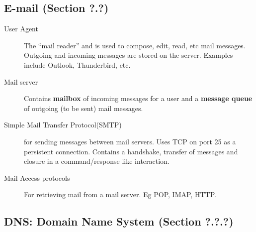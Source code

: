 \documentclass{article}
\begin{document}
\subsection*{E-mail (Section ?.?)}

\begin{description}
    \item[User Agent] The ``mail reader'' and is used to compose, edit, read, etc mail messages.
    Outgoing and incoming messages are stored on the server. Examples include Outlook, Thunderbird, etc.
    
    \item[Mail server] Contains \textbf{mailbox} of incoming messages for a user and a \textbf{message queue}
    of outgoing (to be sent) mail messages.
    
    \item[Simple Mail Transfer Protocol(SMTP)] for sending messages between mail servers. Uses TCP on
    port 25 as a persistent connection. Contains a handshake, transfer of messages and closure in a
    command/response like interaction.
    
    \item[Mail Access protocols] For retrieving mail from a mail server. Eg POP, IMAP, HTTP.
\end{description}

\subsection*{DNS: Domain Name System (Section ?.?.?)}
\end{document}
